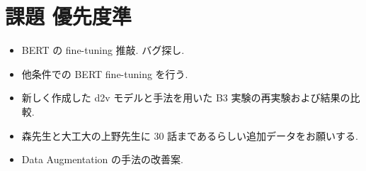 \documentclass[twocolumn]{jarticle}     %
\begin{document}
\section{課題 優先度準}
\begin{itemize}
  \item BERT の fine-tuning 推敲. バグ探し.
  \item 他条件での BERT fine-tuning を行う.
  \item 新しく作成した d2v モデルと手法を用いた B3 実験の再実験および結果の比較.
  \item 森先生と大工大の上野先生に 30 話まであるらしい追加データをお願いする.
  \item Data Augmentation の手法の改善案.
\end{itemize}






\end{document}
